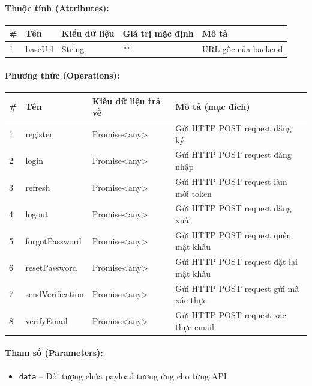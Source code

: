 \documentclass[12pt,a4paper]{article}
\begin{document}
\paragraph{Thuộc tính (Attributes):}
\begin{longtable}{|p{0.6cm}|p{2.8cm}|p{2.2cm}|p{1.8cm}|p{5.8cm}|}
\hline
\textbf{\#} & \textbf{Tên} & \textbf{Kiểu dữ liệu} & \textbf{Giá trị mặc định} & \textbf{Mô tả} \\ \hline
\endhead
1 & baseUrl & String & \texttt{""} & URL gốc của backend \\ \hline
\end{longtable}

\paragraph{Phương thức (Operations):}
\begin{longtable}{|p{0.6cm}|p{3.8cm}|p{2.6cm}|p{6.5cm}|}
\hline
\textbf{\#} & \textbf{Tên} & \textbf{Kiểu dữ liệu trả về} & \textbf{Mô tả (mục đích)} \\ \hline
\endhead
1 & register & Promise\textless{}any\textgreater{} & Gửi HTTP POST request đăng ký \\ \hline
2 & login & Promise\textless{}any\textgreater{} & Gửi HTTP POST request đăng nhập \\ \hline
3 & refresh & Promise\textless{}any\textgreater{} & Gửi HTTP POST request làm mới token \\ \hline
4 & logout & Promise\textless{}any\textgreater{} & Gửi HTTP POST request đăng xuất \\ \hline
5 & forgotPassword & Promise\textless{}any\textgreater{} & Gửi HTTP POST request quên mật khẩu \\ \hline
6 & resetPassword & Promise\textless{}any\textgreater{} & Gửi HTTP POST request đặt lại mật khẩu \\ \hline
7 & sendVerification & Promise\textless{}any\textgreater{} & Gửi HTTP POST request gửi mã xác thực \\ \hline
8 & verifyEmail & Promise\textless{}any\textgreater{} & Gửi HTTP POST request xác thực email \\ \hline
\end{longtable}

\paragraph{Tham số (Parameters):}
\begin{itemize}[leftmargin=*]
    \item \texttt{data} – Đối tượng chứa payload tương ứng cho từng API
\end{itemize}
\end{document}
